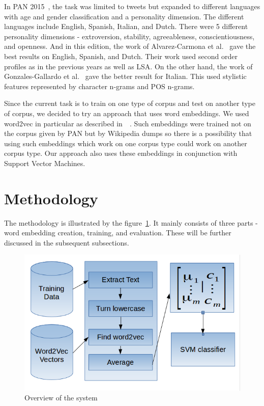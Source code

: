 \documentclass{llncs}
\begin{document}
In PAN 2015~\cite{rangel2015overview}, the task was limited to tweets but expanded to different languages with age and gender classification and a personality dimension. The different languages include English, Spanish, Italian, and Dutch. There were 5 different personality dimensions - extroversion, stability, agreeableness, conscientiousness, and openness. And in this edition, the work of Alvarez-Carmona et al.~\cite{alvarezinaoe} gave the best results on English, Spanish, and Dutch. Their work used second order profiles as in the previous years as well as LSA. On the other hand, the work of Gonzales-Gallardo et al.~\cite{gonzaleztweets} gave the better result for Italian. This used stylistic features represented by character n-grams and POS n-grams.

Since the current task is to train on one type of corpus and test on another type of corpus, we decided to try an approach that uses word embeddings. We used word2vec in particular as described in~\cite{mikolov2013efficient}~\cite{mikolov2013distributed}. Such embeddings were trained not on the corpus given by PAN but by Wikipedia dumps so there is a possibility that using such embeddings which work on one corpus type could work on another corpus type. Our approach also uses these embeddings in conjunction with Support Vector Machines.


\section{Methodology}
The methodology is illustrated by the figure~\ref{System}. It mainly consists of three parts - word embedding creation, training, and evaluation. These will be further discussed in the subsequent subsections.

\begin{figure}
\centering
\caption{Overview of the system}
\label{System}
\includegraphics[scale=.5]{System.png}
\end{figure}
\end{document}
